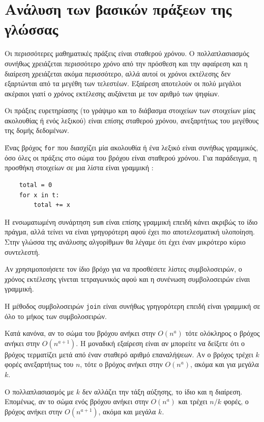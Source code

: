 \documentclass[10pt]{book}
\begin{document}
\section{Ανάλυση των βασικών πράξεων της γλώσσας}

Οι περισσότερες μαθηματικές πράξεις είναι σταθερού χρόνου.  Ο πολλαπλασιασμός 
συνήθως χρειάζεται περισσότερο χρόνο από την πρόσθεση και την αφαίρεση και η διαίρεση χρειάζεται ακόμα περισσότερο, αλλά αυτοί οι χρόνοι εκτέλεσης δεν εξαρτώνται από τα μεγέθη των τελεστέων.  Εξαίρεση αποτελούν οι πολύ μεγάλοι ακέραιοι γιατί ο χρόνος εκτέλεσης αυξάνεται με τον αριθμό των ψηφίων.

Οι πράξεις ευρετηρίασης (το γράψιμο και το διάβασμα στοιχείων των στοιχείων μίας ακολουθίας ή ενός λεξικού) είναι επίσης σταθερού χρόνου, ανεξαρτήτως του μεγέθους της δομής δεδομένων.

Ένας βρόχος  {\tt for}  που διασχίζει μία ακολουθία ή ένα λεξικό είναι συνήθως γραμμικός, όσο όλες οι πράξεις στο σώμα του βρόχου είναι σταθερού χρόνου.  Για παράδειγμα, η προσθήκη στοιχείων σε μια λίστα είναι γραμμική :

\begin{verbatim}
    total = 0
    for x in t:
        total += x
\end{verbatim}

 Η ενσωματωμένη συνάρτηση  {\tt sum}  είναι επίσης γραμμική επειδή κάνει 
ακριβώς το ίδιο πράγμα, αλλά τείνει να είναι γρηγορότερη αφού έχει πιο αποτελεσματική υλοποίηση.  Στην γλώσσα της ανάλυσης αλγορίθμων θα λέγαμε ότι έχει 
έναν μικρότερο κύριο συντελεστή.

Αν χρησιμοποιήσετε τον ίδιο βρόχο για να προσθέσετε λίστες συμβολοσειρών, ο χρόνος εκτέλεσης γίνεται τετραγωνικός αφού και η συνένωση συμβολοσειρών είναι γραμμική.

Η μέθοδος συμβολοσειρών  {\tt join}  είναι συνήθως γρηγορότερη επειδή είναι γραμμική σε όλο το μήκος των συμβολοσειρών.

Κατά κανόνα, αν το σώμα του βρόχου ανήκει στην $O(n^a)$ τότε ολόκληρος ο βρόχος 
ανήκει στην $O(n^{a+1})$.  Η μοναδική εξαίρεση είναι αν μπορείτε να δείξετε ότι 
ο βρόχος τερματίζει μετά από έναν σταθερό αριθμό επαναλήψεων.  Αν ο βρόχος τρέχει 
$k$ φορές ανεξαρτήτως του $n$, τότε ο βρόχος ανήκει στην $O(n^a)$, ακόμα και για μεγάλα $k$.

Ο πολλαπλασιασμός με $k$ δεν αλλάζει την τάξη αύξησης, το ίδιο και η διαίρεση.  
Επομένως, αν το σώμα ενός βρόχου ανήκει στην $O(n^a)$ και τρέχει $n/k$ φορές, ο βρόχος ανήκει στην $O(n^{a+1})$, ακόμα και μεγάλα $k$.
\end{document}
